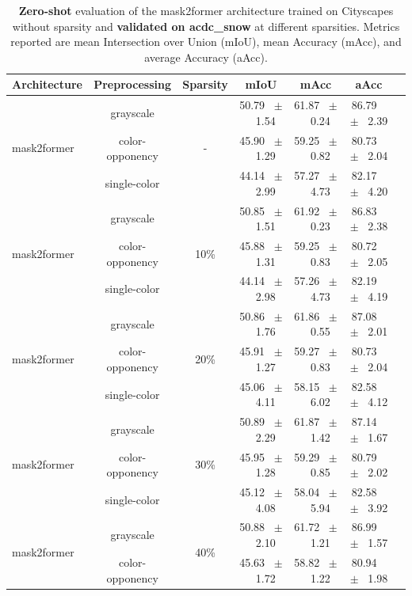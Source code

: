 \begin{table}[h]
  \centering
  \caption{\textbf{Zero-shot} evaluation of the mask2former architecture trained on Cityscapes without sparsity and \textbf{validated on acdc_snow} at different sparsities. Metrics reported are mean Intersection over Union (mIoU), mean Accuracy (mAcc), and average Accuracy (aAcc).}
  \begin{tabular}{@{}lccc ccc@{}}
    \toprule
    Architecture & Preprocessing & Sparsity & mIoU & mAcc & aAcc \\
    \midrule
    \multirow{3}{*}{mask2former} & grayscale & \multirow{3}{*}{-} & 50.79 ~$\pm$~ 1.54 & 61.87 ~$\pm$~ 0.24 & 86.79 ~$\pm$~ 2.39 \\
    & color-opponency &  & 45.90 ~$\pm$~ 1.29 & 59.25 ~$\pm$~ 0.82 & 80.73 ~$\pm$~ 2.04 \\
    & single-color &  & 44.14 ~$\pm$~ 2.99 & 57.27 ~$\pm$~ 4.73 & 82.17 ~$\pm$~ 4.20 \\
    \midrule
    \multirow{3}{*}{mask2former} & grayscale & \multirow{3}{*}{10\%} & 50.85 ~$\pm$~ 1.51 & 61.92 ~$\pm$~ 0.23 & 86.83 ~$\pm$~ 2.38 \\
    & color-opponency &  & 45.88 ~$\pm$~ 1.31 & 59.25 ~$\pm$~ 0.83 & 80.72 ~$\pm$~ 2.05 \\
    & single-color &  & 44.14 ~$\pm$~ 2.98 & 57.26 ~$\pm$~ 4.73 & 82.19 ~$\pm$~ 4.19 \\
    \midrule
    \multirow{3}{*}{mask2former} & grayscale & \multirow{3}{*}{20\%} & 50.86 ~$\pm$~ 1.76 & 61.86 ~$\pm$~ 0.55 & 87.08 ~$\pm$~ 2.01 \\
    & color-opponency &  & 45.91 ~$\pm$~ 1.27 & 59.27 ~$\pm$~ 0.83 & 80.73 ~$\pm$~ 2.04 \\
    & single-color &  & 45.06 ~$\pm$~ 4.11 & 58.15 ~$\pm$~ 6.02 & 82.58 ~$\pm$~ 4.12 \\
    \midrule
    \multirow{3}{*}{mask2former} & grayscale & \multirow{3}{*}{30\%} & 50.89 ~$\pm$~ 2.29 & 61.87 ~$\pm$~ 1.42 & 87.14 ~$\pm$~ 1.67 \\
    & color-opponency &  & 45.95 ~$\pm$~ 1.28 & 59.29 ~$\pm$~ 0.85 & 80.79 ~$\pm$~ 2.02 \\
    & single-color &  & 45.12 ~$\pm$~ 4.08 & 58.04 ~$\pm$~ 5.94 & 82.58 ~$\pm$~ 3.92 \\
    \midrule
    \multirow{3}{*}{mask2former} & grayscale & \multirow{3}{*}{40\%} & 50.88 ~$\pm$~ 2.10 & 61.72 ~$\pm$~ 1.21 & 86.99 ~$\pm$~ 1.57 \\
    & color-opponency &  & 45.63 ~$\pm$~ 1.72 & 58.82 ~$\pm$~ 1.22 & 80.94 ~$\pm$~ 1.98 \\

\end{tabular}
\end{table}
